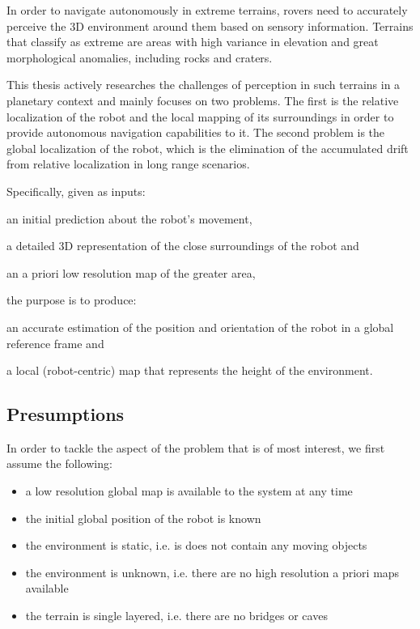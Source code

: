 In order to navigate autonomously in extreme terrains, rovers need to
accurately perceive the 3D environment around them based on sensory
information.
Terrains that classify as extreme are areas with high variance in elevation
and great morphological anomalies, including rocks and craters.

This thesis actively researches the challenges of perception in such terrains
in a planetary context and mainly focuses on two problems.
The first is the relative localization of the robot and the local mapping
of its surroundings in order to provide autonomous navigation capabilities
to it.
The second problem is the global localization of the robot, which is the
elimination of the accumulated drift from relative localization in long
range scenarios.

Specifically, given as inputs:
\begin{enumerate*}[label=(\roman*)]
    \item an initial prediction about the robot's movement,
    \item a detailed 3D representation of the close surroundings of the robot
        and
    \item an a priori low resolution map of the greater area,
\end{enumerate*}
the purpose is to produce:
\begin{enumerate*}[label=(\roman*)]
    \item an accurate estimation of the position and orientation of the
        robot in a global reference frame and
    \item a local (robot-centric) map that represents the height of
        the environment.
\end{enumerate*}

\subsection{Presumptions}

In order to tackle the aspect of the problem that is of most interest,
we first assume the following:

\begin{itemize}
    \item a low resolution global map is available to the system at any time
    \item the initial global position of the robot is known
    \item the environment is static, i.e. is does not contain any
        moving objects
    \item the environment is unknown, i.e. there are no high resolution
        a priori maps available
    \item the terrain is single layered, i.e. there are no bridges or caves
\end{itemize}


